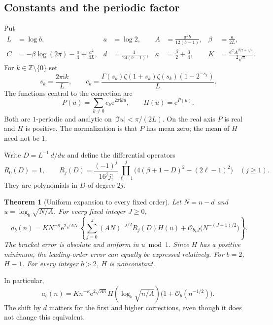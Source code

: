 \documentclass[11pt,letterpaper]{article}
\numberwithin{equation}{section}
\newtheorem{theorem}{Theorem}[section]
\theoremstyle{remark}\newtheorem{remark}[theorem]{Remark}
\newcommand{\ii}{\mathrm i}
\newcommand{\ee}{\mathrm e}
\newcommand{\Z}{\mathbb Z}
\newcommand{\Ord}{\mathcal O}
\begin{document}
\subsection{Constants and the periodic factor}\label{rlp:sec:constants}
Put
\begin{align}
 L&=\log b, & a&=\log2, & A&=\frac{\pi^2b}{12(b-1)}, & \beta&=\frac a{2L},\label{rlp:eq:constants1}\\
 C&=-\beta\log(2\pi)-\frac a4+\frac{a^2}{4L}, &
 d&=\frac1{24(b-1)}, &
 \kappa&=\frac\beta2+\frac34, &
 K&=\frac{\ee^C A^{\beta/2+1/4}}{2\sqrt\pi}.\label{rlp:eq:constants2}
\end{align}
For $k\in\Z\setminus\{0\}$ set
\begin{equation}\label{rlp:eq:ck}
 s_k=\frac{2\pi\ii k}{L},\qquad
 c_k=\frac{\Gamma(s_k)\zeta(1+s_k)\zeta(s_k)(1-2^{-s_k})}{L}.
\end{equation}
The functions central to the correction are
\begin{equation}\label{rlp:eq:PH}
 P(u)=\sum_{k\ne0}c_k\ee^{2\pi\ii k u},\qquad H(u)=\ee^{P(u)}.
\end{equation}
Both are $1$-periodic and analytic on $|\Im u|<\pi/(2L)$. On the real axis $P$ is real and $H$ is positive. The normalization is that $P$ has mean zero; the mean of $H$ need not be $1$.

Write $D=L^{-1}\,d/du$ and define the differential operators
\begin{equation}\label{rlp:eq:R}
 R_0(D)=1,\qquad
 R_j(D)=\frac{(-1)^j}{16^j j!}
  \prod_{\ell=1}^j\bigl(4(\beta+1-D)^2-(2\ell-1)^2\bigr)\quad(j\ge1).
\end{equation}
They are polynomials in $D$ of degree $2j$.

\begin{theorem}[Uniform expansion to every fixed order]\label{rlp:thm:main}
Let $N=n-d$ and $u=\log_b\sqrt{N/A}$. For every fixed integer $J\ge0$,
\begin{equation}\label{rlp:eq:main}
\boxed{\quad
 a_b(n)=K N^{-\kappa}\ee^{2\sqrt{AN}}
 \left\{\sum_{j=0}^J(AN)^{-j/2}R_j(D)H(u)
       +\Ord_{b,J}\bigl(N^{-(J+1)/2}\bigr)\right\}.
 \quad}
\end{equation}
The bracket error is absolute and uniform in $u\bmod1$. Since $H$ has a positive minimum, the leading-order error can equally be expressed relatively. For $b=2$, $H\equiv1$. For every integer $b>2$, $H$ is nonconstant.
\end{theorem}
In particular,
\begin{equation}\label{rlp:eq:leading}
 a_b(n)=K n^{-\kappa}\ee^{2\sqrt{An}}
 H\left(\log_b\sqrt{n/A}\right)\bigl(1+\Ord_b(n^{-1/2})\bigr).
\end{equation}
The shift by $d$ matters for the first and higher corrections, even though it does not change this equivalent.
\end{document}
